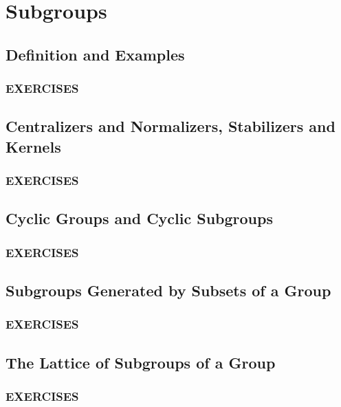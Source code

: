 \chapter{Subgroups}

\section{Definition and Examples}
\subsection*{\centering EXERCISES}

\section{Centralizers and Normalizers, Stabilizers and Kernels}
\subsection*{\centering EXERCISES}

\section{Cyclic Groups and Cyclic Subgroups}
\subsection*{\centering EXERCISES}

\section{Subgroups Generated by Subsets of a Group}
\subsection*{\centering EXERCISES}

\section{The Lattice of Subgroups of a Group}
\subsection*{\centering EXERCISES}
